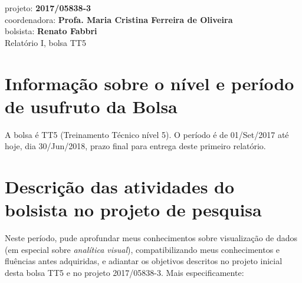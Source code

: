 \documentclass[a4paper, 11pt]{article}
\begin{document}
\noindent
\normalsize projeto: \textbf{2017/05838-3} \\
coordenadora: \textbf{Profa. Maria Cristina Ferreira de Oliveira} \\
bolsista: \textbf{Renato Fabbri} \\
Relatório I, bolsa TT5 \\

\section{Informação sobre o nível e período de usufruto da Bolsa}
A bolsa é TT5 (Treinamento Técnico nível 5).
O período é de 01/Set/2017 até hoje, dia 30/Jun/2018,
prazo final para entrega deste primeiro relatório.

\section{Descrição das atividades do bolsista no projeto de pesquisa}
Neste período, pude aprofundar meus conhecimentos sobre visualização de dados
(em especial sobre \emph{analítica visual}),
compatibilizando meus conhecimentos e fluências antes adquiridas,
e adiantar os objetivos descritos no projeto inicial desta bolsa TT5 e no
projeto 2017/05838-3.
Mais especificamente:
\end{document}
